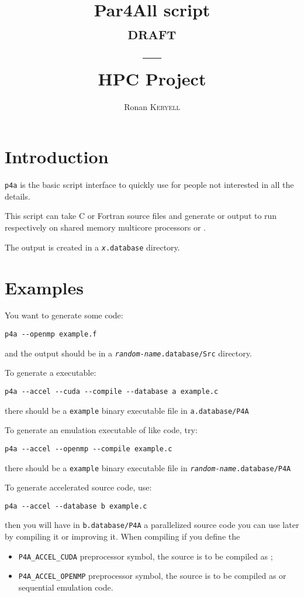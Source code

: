 \documentclass[a4paper]{article}
\begin{document}
\title{Par4All script\\
  \textsc{draft}\\
  ---\\
  HPC Project}

\author{Ronan \textsc{Keryell}}

\maketitle

\tableofcontents{}

\section{Introduction}
\label{sec:introduction}

\texttt{p4a} is the basic script interface to quickly use \Apfa for people
not interested in all the \Apfa details.

This script can take C or Fortran source files and generate \Aopenmp or
\Acuda output to run respectively on shared memory multicore processors or
\Agpu.

The output is created in a \texttt{\emph{x}.database} directory.


\section{Examples}
\label{sec:examples}

You want to generate some \Aopenmp code:
\begin{verbatim}
p4a --openmp example.f
\end{verbatim}
and the output should be in a \texttt{\emph{random-name}.database/Src}
directory.

To generate a \Acuda executable:
\begin{verbatim}
p4a --accel --cuda --compile --database a example.c
\end{verbatim}
there should be a \texttt{example} binary executable file in
\texttt{a.database/P4A}

To generate an \Aopenmp emulation executable of \Agpu like code, try:
\begin{verbatim}
p4a --accel --openmp --compile example.c
\end{verbatim}
there should be a \texttt{example} binary executable file in
\texttt{\emph{random-name}.database/P4A}

To generate accelerated source code, use:
\begin{verbatim}
p4a --accel --database b example.c
\end{verbatim}
then you will have in \texttt{b.database/P4A} a parallelized source code
you can use later by compiling it or improving it. When compiling if you
define the
\begin{itemize}
\item \verb|P4A_ACCEL_CUDA| preprocessor symbol, the source is to be
  compiled as \Acuda;
\item \verb|P4A_ACCEL_OPENMP| preprocessor symbol, the source is to be
  compiled as \Aopenmp or sequential emulation code.
\end{itemize}
\end{document}
